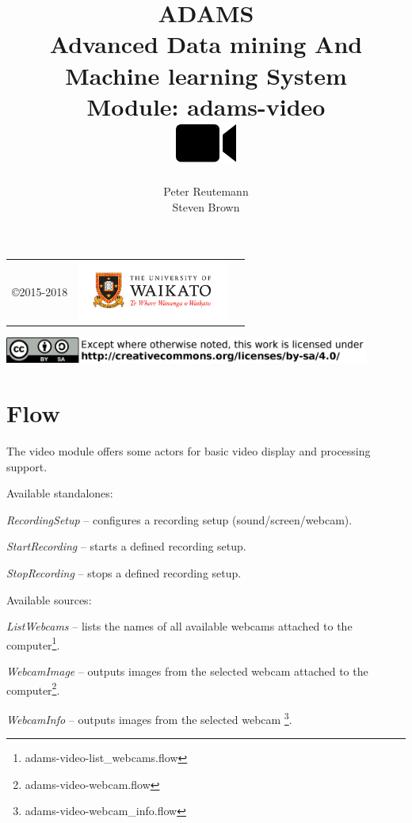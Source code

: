 \documentclass[a4paper]{book}
\title{
  \textbf{ADAMS} \\
  {\Large \textbf{A}dvanced \textbf{D}ata mining \textbf{A}nd \textbf{M}achine
  learning \textbf{S}ystem} \\
  {\Large Module: adams-video} \\
  \vspace{1cm}
  \includegraphics[width=2cm]{images/video-module.png} \\
}
\author{
  Peter Reutemann \\
  Steven Brown
}
\begin{document}
\begin{titlepage}
\maketitle

\thispagestyle{empty}
\center
\begin{table}[b]
	\begin{tabular}{c l l}
		\parbox[c][2cm]{2cm}{\copyright 2015-2018} &
		\parbox[c][2cm]{5cm}{\includegraphics[width=5cm]{images/coat_of_arms.pdf}} \\
	\end{tabular}
	\includegraphics[width=12cm]{images/cc.png} \\
\end{table}

\end{titlepage}

\tableofcontents
\listoffigures

\chapter{Flow}
The video module offers some actors for basic video display and processing support.

\noindent Available standalones:
\begin{tight_itemize}
    \item \textit{RecordingSetup} -- configures a recording setup (sound/screen/webcam).
    \item \textit{StartRecording} -- starts a defined recording setup.
    \item \textit{StopRecording} -- stops a defined recording setup.
\end{tight_itemize}

\noindent Available sources:
\begin{tight_itemize}
    \item \textit{ListWebcams} -- lists the names of all available webcams
    attached to the computer\footnote{adams-video-list\_webcams.flow}.
    \item \textit{WebcamImage} -- outputs images from the selected webcam
    attached to the computer\footnote{adams-video-webcam.flow}.
    \item \textit{WebcamInfo} -- outputs images from the selected webcam
    \footnote{adams-video-webcam\_info.flow}.
\end{tight_itemize}
\end{document}
